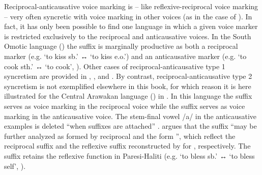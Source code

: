 Reciprocal-anticausative voice marking is -- like reflexive-reciprocal voice marking -- very often syncretic with voice marking in other voices (as in the case of ). In fact, it has only been possible to find one language in which a given voice marker is restricted exclusively to the reciprocal and anticausative voices. In the South Omotic language  () the suffix  is marginally productive as both a reciprocal marker (e.g.  ‘to kiss sb.’ ↔  ‘to kiss e.o.’) and an anticausative marker (e.g.  ‘to cook sth.’ ↔  ‘to cook’, \citealt[148ff.]{petrollino:2016}). Other cases of reciprocal-anticausative type 1 syncretism are provided in , , and . By contrast, reciprocal-anticausative type 2 syncretism is not exemplified elsewhere in this book, for which reason it is here illustrated for the Central Arawakan language  () in . In this language the suffix  serves as voice marking in the reciprocal voice while the suffix  serves as voice marking in the anticausative voice. The stem-final vowel /a/ in the anticausative examples is deleted “when suffixes are attached” \citep[68f.]{brandao:2014}. \citet[259]{brandao:2014} argues that the suffix  “may be further analyzed as formed by reciprocal  and the  form ”, which reflect the reciprocal suffix  and the reflexive suffix  reconstructed by \citet{wise:1990} for , respectively. The suffix  retains the reflexive function in Paresi-Haliti (e.g.  ‘to bless sb.’ ↔  ‘to bless self’, \citealt[251]{brandao:2014}).

